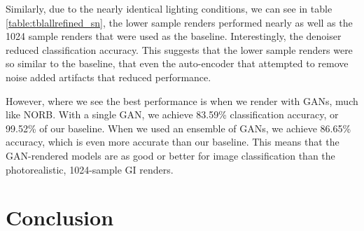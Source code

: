 \documentclass[10pt,twocolumn,letterpaper]{article}
\begin{document}
Similarly, due to the nearly identical lighting conditions, we can see in table \ref{table:tblallrefined_sn}, the lower sample renders performed nearly as well as the 1024 sample renders that were used as the baseline. Interestingly, the denoiser reduced classification accuracy. This suggests that the lower sample renders were so similar to the baseline, that even the auto-encoder that attempted to remove noise added artifacts that reduced performance. %

However, where we see the best performance is when we render with GANs, much like NORB. With a single GAN, we achieve 83.59\% classification accuracy, or 99.52\% of our baseline. When we used an ensemble of GANs, we achieve 86.65\% accuracy, which is even more accurate than our baseline. This means that the GAN-rendered models are as good or better for image classification than the photorealistic, 1024-sample GI renders.

\section{Conclusion}
\end{document}
